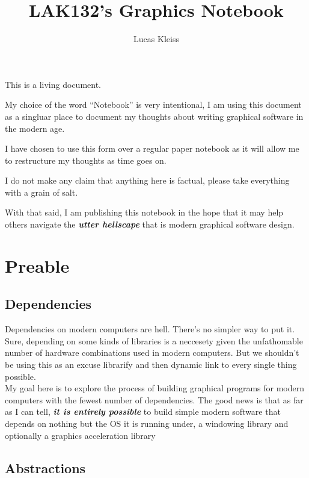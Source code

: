 \documentclass{article}
\title{LAK132's Graphics Notebook}
\author{Lucas Kleiss}
\newcommand{\textem}[1]{\textit{\textbf{#1}}}
\begin{document}
\maketitle

This is a living document.

My choice of the word ``Notebook'' is very intentional,
I am using this document as a singluar place to document my thoughts about
writing graphical software in the modern age.

I have chosen to use this form over a regular paper notebook as it will allow
me to restructure my thoughts as time goes on.

I do not make any claim that anything here is factual,
please take everything with a grain of salt.

With that said, I am publishing this notebook in the hope that it may help
others navigate the \textem{utter hellscape} that is modern graphical
software design.

\pagebreak
\tableofcontents


\pagebreak
\section{Preable}
\label{sec:preamble}

\subsection{Dependencies}
\label{subsect:dependencies}

Dependencies on modern computers are hell.
There's no simpler way to put it.
Sure, depending on some kinds of libraries is a neccesety given the
unfathomable number of hardware combinations used in modern computers.
But we shouldn't be using this as an excuse librarify and then dynamic link to
every single thing possible.
\\
My goal here is to explore the process of building graphical programs for
modern computers with the fewest number of dependencies.
The good news is that as far as I can tell,
\textem{it is entirely possible} to build simple modern software that
depends on nothing but the OS it is running under, a windowing library and
optionally a graphics acceleration library

\subsection{Abstractions}
\label{subsec:abstractions}
\end{document}
